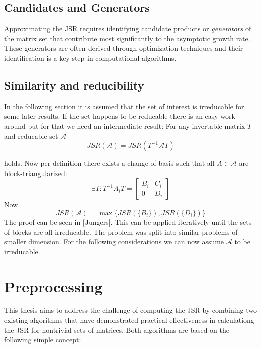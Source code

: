 \subsection*{Candidates and Generators}
Approximating the JSR requires identifying candidate products or \emph{generators} of the matrix set that contribute most significantly to the asymptotic growth rate. These generators are often derived through optimization techniques and their identification is a key step in computational algorithms.

\subsection*{Similarity and reducibility}
In the following section it is assumed that the set of interest is irreducable for some later results. If the set happens to be reducable there is an easy work-around but for that we need an intermediate result: 
For any invertable matrix $T$ and reducable set $\mathcal{A}$
\begin{equation}
   JSR(\mathcal{A}) = JSR(T^{-1}\mathcal{A}T) 
\end{equation}

holds. Now per definition there exists a change of basis such that all $A \in \mathcal{A}$ are block-triangularized: 
$$\exists T: T^{-1}A_{i}T = 
\begin{bmatrix}
B_i & C_i  \\
0 & D_i
\end{bmatrix}
$$
Now 
\begin{equation}
    JSR(\mathcal{A}) = \max\{JSR(\{B_i\}), JSR(\{D_i\})\}
\end{equation}
The proof can be seen in [Jungers].
This can be applied iteratively until the sets of blocks are all irreducable.
The problem was split into similar problems of smaller dimension.
For the following considerations we can now assume $\mathcal{A}$ to be irreducable.

\section{Preprocessing}
This thesis aims to address the challenge of computing the JSR by combining two existing algorithms that have demonstrated practical effectiveness in calculationg the JSR for nontrivial sets of matrices. Both algorithms are based on the following simple concept: \\

